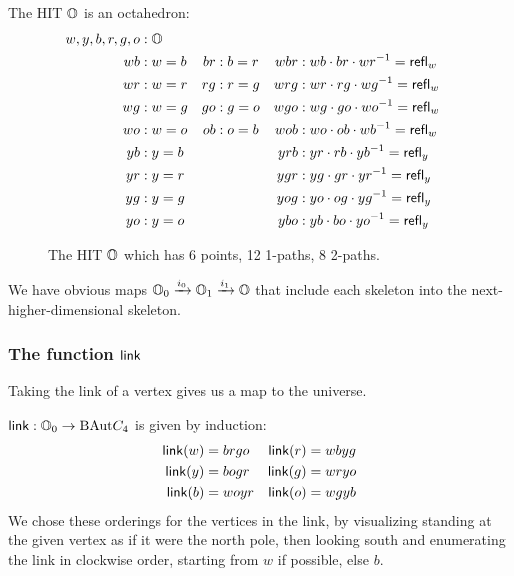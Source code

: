 \begin{mydef}
The HIT \( \mathbb{O} \) is an octahedron:
\begin{align*}
w, y, b, r, g, o &: \mathbb{O} \\
wb &: w=b & br &: b=r & wbr &: wb\cdot br\cdot wr^{-1} = \mathsf{refl}_w \\
wr &: w=r & rg &: r=g & wrg &: wr\cdot rg\cdot wg^{-1} = \mathsf{refl}_w \\
wg &: w=g & go &: g=o & wgo &: wg\cdot go\cdot wo^{-1} = \mathsf{refl}_w \\
wo &: w=o & ob &: o=b & wob &: wo\cdot ob\cdot wb^{-1} = \mathsf{refl}_w \\
yb &: y=b & & & yrb &: yr\cdot rb\cdot yb^{-1} = \mathsf{refl}_y \\
yr &: y=r & & & ygr &: yg\cdot gr\cdot yr^{-1} = \mathsf{refl}_y \\
yg &: y=g & & & yog &: yo\cdot og\cdot yg^{-1} = \mathsf{refl}_y \\
yo &: y=o & & & ybo &: yb\cdot bo\cdot yo^{-1} = \mathsf{refl}_y 
\end{align*}
\end{mydef}

\begin{figure}[htbp]
\centering

\caption{The HIT \( \mathbb{O} \) which has 6 points, 12 1-paths, 8 2-paths.}
\end{figure}

We have obvious maps \( \mathbb{O}_0\xrightarrow[]{i_0} \mathbb{O}_1\xrightarrow[]{i_1} \mathbb{O} \) that include each skeleton into the next-higher-dimensional skeleton.

\subsubsection{The function \texorpdfstring{\( \mathsf{link} \)}{link}}

Taking the link of a vertex gives us a map to the universe.

\begin{mydef}
\( \mathsf{link}:\mathbb{O}_0\to\mathrm{BAut} C_4 \) is given by induction:
\begin{align*}
\mathsf{link}(w) &= brgo & \mathsf{link}(r) &= wbyg \\
\mathsf{link}(y) &= bogr & \mathsf{link}(g) &= wryo \\
\mathsf{link}(b) &= woyr & \mathsf{link}(o) &= wgyb
\end{align*}
We chose these orderings for the vertices in the link, by visualizing standing at the given vertex as if it were the north pole, then looking south and enumerating the link in clockwise order, starting from \( w \) if possible, else \( b \).
\end{mydef}

